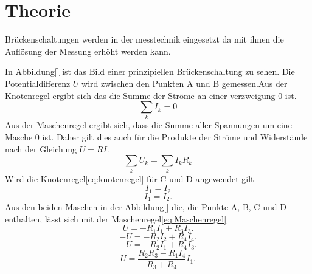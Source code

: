 \section{Theorie}
\label{sec:Theorie}

\cite{sample}
Brückenschaltungen werden in der messtechnik eingesetzt da mit ihnen die Auflösung
der Messung erhöht werden kann.

In Abbildung\ref{} ist das Bild einer prinzipiellen Brückenschaltung zu sehen.
Die Potentialdifferenz $U$ wird zwischen den Punkten A und B gemessen.Aus der
Knotenregel ergibt sich das die Summe der Ströme an einer verzweigung $0$ ist.
\begin{equation}
  \sum \limits_{k} I_k= 0
  \label{eq:knotenregel}
\end{equation}
Aus der Maschenregel ergibt sich, dass die Summe aller Spannungen um eine Masche
$0$ ist. Daher gilt dies auch für die Produkte der Ströme und Widerstände nach
der Gleichung $U=RI$.
\begin{equation}
  \sum \limits_{k} U_k=  \sum \limits_{k} I_k R_k
  \label{eq:Maschenregel}
\end{equation}
Wird die Knotenregel\eqref{eq:knotenregel} für C und D angewendet gilt
\begin{equation}
  I_1=I_2
\end{equation}
\begin{equation}
  I_1=I_2    .
\end{equation}
Aus den beiden Maschen in der Abbildung\ref{} die, die Punkte A, B, C und D enthalten,
lässt sich mit der Maschenregel\eqref{eq:Maschenregel}
\begin{equation}
  U=-R_1 I_1 + R_3 I_3   .
\end{equation}
\begin{equation}
  -U=-R_2 I_2 + R_4 I_4   .
\end{equation}
\begin{equation}
  -U=-R_2 I_1 + R_4 I_3   .
\end{equation}
\begin{equation}
  U=\frac{R_2 R_3 - R_1 I_4}{R_3 + R_4}I_1   .
\end{equation}

